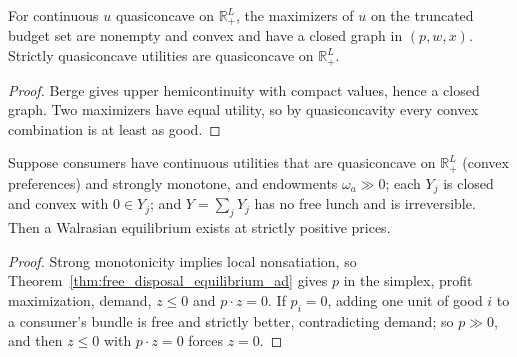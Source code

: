 \begin{lemma}
\label{lem:trunc_demand_convex}
\leanok
{}
For continuous $u$ quasiconcave on $\mathbb{R}^L_+$, the maximizers of $u$ on the truncated budget set are nonempty and
convex and have a closed graph in $(p, w, x)$. Strictly quasiconcave utilities are quasiconcave on $\mathbb{R}^L_+$.
\end{lemma}
\begin{proof}
\leanok
Berge gives upper hemicontinuity with compact values, hence a closed graph. Two maximizers have equal utility, so by
quasiconcavity every convex combination is at least as good.
\end{proof}

\begin{theorem}
\label{thm:existence_arrow_debreu_convex}
\leanok
{}
Suppose consumers have continuous utilities that are quasiconcave on $\mathbb{R}^L_+$ (convex preferences) and strongly
monotone, and endowments $\omega_a \gg 0$; each $Y_j$ is closed and convex with $0 \in Y_j$; and $Y = \sum_j Y_j$ has no free
lunch and is irreversible. Then a Walrasian equilibrium exists at strictly positive prices.
\end{theorem}
\begin{proof}
\leanok
Strong monotonicity implies local nonsatiation, so Theorem~\ref{thm:free_disposal_equilibrium_ad} gives $p$ in the
simplex, profit maximization, demand, $z \le 0$ and $p \cdot z = 0$. If $p_i = 0$, adding one unit of good $i$ to a
consumer's bundle is free and strictly better, contradicting demand; so $p \gg 0$, and then $z \le 0$ with
$p \cdot z = 0$ forces $z = 0$.
\end{proof}

